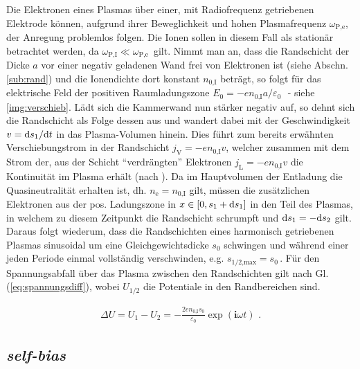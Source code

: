 \documentclass[numbers=noenddot,a4paper,notitlepage,twoside,BCOR15mm]{scrbook}
\newcommand{\diff}{\textnormal{d}}
\newcommand{\ix}[1]{_\text{#1}}
\newcommand{\imag}{\mathbf{i}}
\newcommand{\tilt}[1]{\textit{#1}}
\begin{document}
				Die Elektronen eines Plasmas über einer, mit Radiofrequenz getriebenen Elektrode können, aufgrund ihrer Beweglichkeit und hohen Plasmafrequenz $\omega\ix{P,e}$, der Anregung problemlos folgen. Die Ionen sollen in diesem Fall als stationär betrachtet werden, da $\omega\ix{P,I}\ll\omega\ix{P,e}\,$ gilt. Nimmt man an, dass die Randschicht der Dicke $a$ vor einer negativ geladenen Wand frei von Elektronen ist (siehe Abschn. \ref{sub:rand}) und die Ionendichte dort konstant $n\ix{0,I}$ beträgt, so folgt für das elektrische Feld der positiven Raumladungszone $E\ix{0}=-en\ix{0,I}a/\varepsilon\ix{0}\,\,$ - siehe \ref{img:verschieb}. Lädt sich die Kammerwand nun stärker negativ auf, so dehnt sich die Randschicht als Folge dessen aus und wandert dabei mit der Geschwindigkeit $v=\diff s\ix{1}/\diff t$ in das Plasma-Volumen hinein. Dies führt zum bereits erwähnten Verschiebungstrom in der Randschicht $j\ix{V}=-en\ix{0,I}v$, welcher zusammen mit dem Strom der, aus der Schicht "`verdrängten"' Elektronen $j\ix{L}=-en\ix{0,I}v$ die Kontinuität im Plasma erhält (nach \cite{Godyak90d}). Da im Hauptvolumen der Entladung die Quasineutralität erhalten ist, dh. $n\ix{e}=n\ix{0,I}$ gilt, müssen die zusätzlichen Elektronen aus der pos. Ladungszone in $x\in\left[0,s\ix{1}+\diff s\ix{1}\right]$ in den Teil des Plasmas, in welchem zu diesem Zeitpunkt die Randschicht schrumpft und $\diff s\ix{1}=-\diff s\ix{2}$ gilt. Daraus folgt wiederum, dass die Randschichten eines harmonisch getriebenen Plasmas sinusoidal um eine Gleichgewichtsdicke $s\ix{0}$ schwingen und während einer jeden Periode einmal vollständig verschwinden, e.g. $s\ix{1/2,max}=s\ix{0}\,$.  Für den Spannungsabfall über das Plasma zwischen den Randschichten gilt nach \cite{Piel10} Gl. (\ref{eq:spannungsdiff}), wobei $U\ix{1/2}$ die Potentiale in den Randbereichen sind. 

					\begin{align}
						\Delta U=U\ix{1}-U\ix{2}=-\frac{2en\ix{0,I}s\ix{0}}{\varepsilon\ix{0}}\exp\left(\imag\omega t\right)\,\,. \label{eq:spannungsdiff}
					\end{align}

				\subsection{\tilt{self-bias}}  \label{subsub:self-bias}
\end{document}
